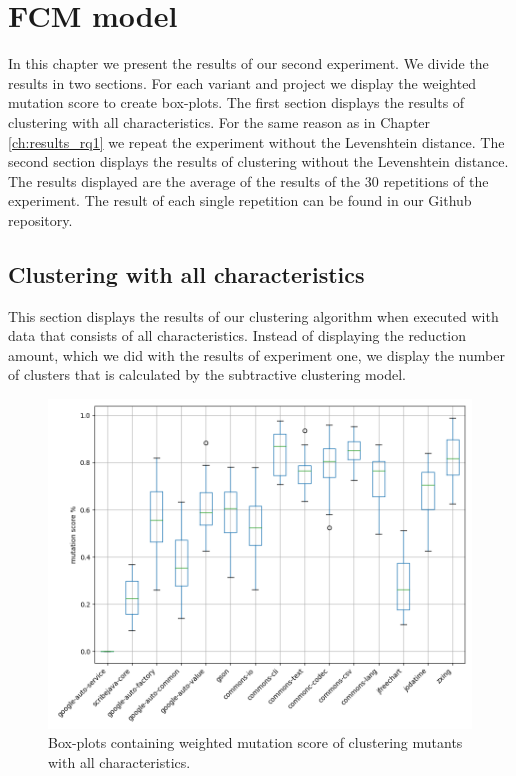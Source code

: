 \documentclass[../../main]{subfiles}
\begin{document}
\section{FCM model}
\label{ch:results_rq2}
In this chapter we present the results of our second experiment.
We divide the results in two sections. 
For each variant and project we display the weighted mutation score to create box-plots.
The first section displays the results of clustering with all characteristics.
For the same reason as in Chapter \ref{ch:results_rq1} we repeat the experiment without the Levenshtein distance.
The second section displays the results of clustering without the Levenshtein distance.
\newline
The results displayed are the average of the results of the 30 repetitions of the experiment.
The result of each single repetition can be found in our Github repository\cite{rbasarat-repo}.

\subsection{Clustering with all characteristics}
This section displays the results of our clustering algorithm when executed with data that consists of all characteristics. 
Instead of displaying the reduction amount, which we did with the results of experiment one, we display the number of clusters that is calculated by the subtractive clustering model.

\begin{figure}[H]
\includegraphics[width=\textwidth]{images/fcm_summary/fcm_full.png}
\caption{\label{box:clustering_fcm_all_25}Box-plots containing weighted mutation score of clustering mutants with all characteristics.}
\end{figure}
\end{document}
